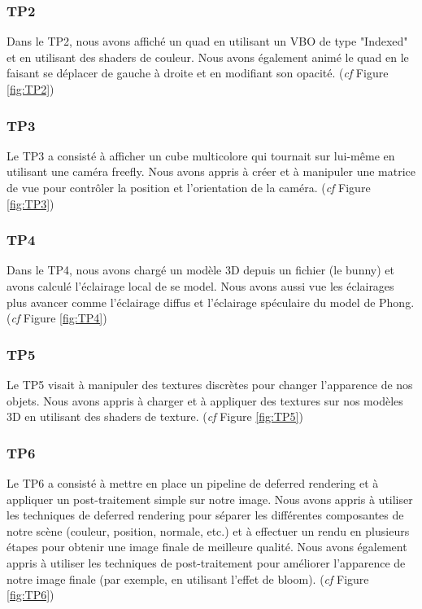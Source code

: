 \documentclass[10pt,a4paper]{article}
\begin{document}
			\subsubsection{TP2}
				Dans le TP2, nous avons affiché un quad en utilisant un VBO de type "Indexed" et en utilisant des shaders de couleur. Nous avons également animé le quad en le faisant se déplacer de gauche à droite et en modifiant son opacité.  (\textit{cf} Figure \ref{fig:TP2})

			\subsubsection{TP3}
				Le TP3 a consisté à afficher un cube multicolore qui tournait sur lui-même en utilisant une caméra freefly. Nous avons appris à créer et à manipuler une matrice de vue pour contrôler la position et l'orientation de la caméra. (\textit{cf} Figure \ref{fig:TP3})

			\subsubsection{TP4}
				Dans le TP4, nous avons chargé un modèle 3D depuis un fichier (le bunny) et avons calculé l'éclairage local de se model. Nous avons aussi vue les éclairages plus avancer comme l'éclairage diffus et l'éclairage spéculaire du model de Phong. (\textit{cf} Figure \ref{fig:TP4})

			\subsubsection{TP5}
				Le TP5 visait à manipuler des textures discrètes pour changer l'apparence de nos objets. Nous avons appris à charger et à appliquer des textures sur nos modèles 3D en utilisant des shaders de texture. (\textit{cf} Figure \ref{fig:TP5})
			
			\subsubsection{TP6}
				Le TP6 a consisté à mettre en place un pipeline de deferred rendering et à appliquer un post-traitement simple sur notre image. Nous avons appris à utiliser les techniques de deferred rendering pour séparer les différentes composantes de notre scène (couleur, position, normale, etc.) et à effectuer un rendu en plusieurs étapes pour obtenir une image finale de meilleure qualité. Nous avons également appris à utiliser les techniques de post-traitement pour améliorer l'apparence de notre image finale (par exemple, en utilisant l'effet de bloom). (\textit{cf} Figure \ref{fig:TP6})
\end{document}
